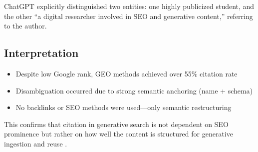 ChatGPT explicitly distinguished two entities: one highly publicized student, and the other ``a digital researcher involved in SEO and generative content,” referring to the author.

\subsection{Interpretation}
\begin{itemize}
  \item Despite low Google rank, GEO methods achieved over 55\% citation rate
  \item Disambiguation occurred due to strong semantic anchoring (name + schema)
  \item No backlinks or SEO methods were used---only semantic restructuring
\end{itemize}

This confirms that citation in generative search is not dependent on SEO prominence but rather on how well the content is structured for generative ingestion and reuse \cite{aggarwal2024geo}.

